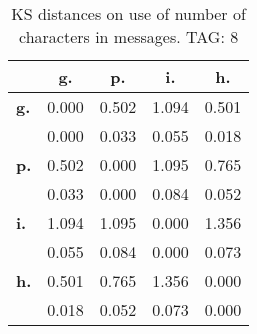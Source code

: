 \begin{table}[h!]
\begin{center}
\begin{tabular}{| l || c | c | c | c |}\hline
 & {\bf g.} & {\bf p.} & {\bf i.} & {\bf h.} \\\hline\hline
{\bf g.} & 0.000 & 0.502 & 1.094 & 0.501 \\
{\bf } & 0.000 & 0.033 & 0.055 & 0.018 \\\hline
{\bf p.} & 0.502 & 0.000 & 1.095 & 0.765 \\
{\bf } & 0.033 & 0.000 & 0.084 & 0.052 \\\hline
{\bf i.} & 1.094 & 1.095 & 0.000 & 1.356 \\
{\bf } & 0.055 & 0.084 & 0.000 & 0.073 \\\hline
{\bf h.} & 0.501 & 0.765 & 1.356 & 0.000 \\
{\bf } & 0.018 & 0.052 & 0.073 & 0.000 \\\hline
\end{tabular}
\caption{KS distances on use of number of characters in messages. TAG: 8}
\end{center}
\end{table}